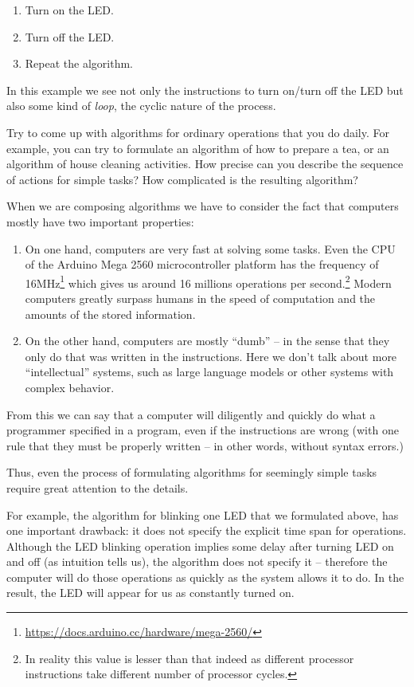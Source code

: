 \documentclass[../sparc.tex]{subfiles}
\begin{document}
\begin{enumerate}
\item Turn on the LED.
\item Turn off the LED.
\item Repeat the algorithm.
\end{enumerate}

In this example we see not only the instructions to turn on/turn off the LED but
also some kind of \emph{loop}, the cyclic nature of the process.

 { Try to come up with algorithms for ordinary operations that you
  do daily.  For example, you can try to formulate an algorithm of how to
  prepare a tea, or an algorithm of house cleaning activities.  How precise can
  you describe the sequence of actions for simple tasks?  How complicated is the
  resulting algorithm? }

When we are composing algorithms we have to consider the fact that computers
mostly have two important properties:
\begin{enumerate}
\item On one hand, computers are very fast at solving some tasks.  Even the CPU
  of the Arduino Mega 2560 microcontroller platform has the frequency of
  16MHz\footnote{\url{https://docs.arduino.cc/hardware/mega-2560/}} which gives
  us around 16 millions operations per second.\footnote{In reality this value is
  lesser than that indeed as different processor instructions take different
  number of processor cycles.}  Modern computers greatly surpass humans in the
  speed of computation and the amounts of the stored information.
\item On the other hand, computers are mostly ``dumb'' -- in the sense that they
  only do that was written in the instructions.  Here we don't talk about more
  ``intellectual'' systems, such as large language models or other systems with
  complex behavior.
\end{enumerate}

From this we can say that a computer will diligently and quickly do what a
programmer specified in a program, even if the instructions are wrong (with one
rule that they must be properly written -- in other words, without syntax
errors.)

Thus, even the process of formulating algorithms for seemingly simple tasks
require great attention to the details.

For example, the algorithm for blinking one LED that we formulated above, has
one important drawback: it does not specify the explicit time span for
operations.  Although the LED blinking operation implies some delay after
turning LED on and off (as intuition tells us), the algorithm does not specify
it -- therefore the computer will do those operations as quickly as the system
allows it to do.  In the result, the LED will appear for us as constantly turned
on.
\end{document}
